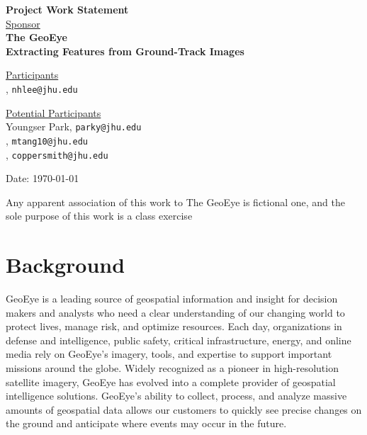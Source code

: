 \documentclass[12pt,letterpaper]{article}
\theoremstyle{definition}
\begin{document}
\def\shiftdowna{0.32in}  %
\def\shiftdownb{0.22in}  %


\begin{center}
\textbf{{\large Project Work Statement}}\\


\vspace \shiftdowna
\underline {Sponsor}\\ 
\vspace{5pt}
\textbf{{\large The GeoEye}}\\


\vspace \shiftdowna
\textbf{{\large Extracting Features from Ground-Track Images}}


\vspace{0.35in}
\vspace \shiftdownb
\underline {Participants} \\
\vspace{5pt}
, \texttt{nhlee@jhu.edu}

\vspace \shiftdownb
\underline {Potential Participants}\\
\vspace{5pt}
Youngser Park, \texttt{parky@jhu.edu} \\
\vspace{3pt}
, \texttt{mtang10@jhu.edu} \\
\vspace{3pt}
, \texttt{coppersmith@jhu.edu}

\vspace \shiftdowna
Date: \today

\end{center}

\vfill  
\footnoterule
\noindent \small{Any apparent association of this work to The GeoEye is
fictional one, and the sole purpose of this work is a class exercise}

\newpage

\section{Background} 
GeoEye is a leading source of geospatial information and insight for decision
makers and analysts who need a clear understanding of our changing world to
protect lives, manage risk, and optimize resources. Each day, organizations in
defense and intelligence, public safety, critical infrastructure, energy, and
online media rely on GeoEye's imagery, tools, and expertise to support
important missions around the globe. Widely recognized as a pioneer in
high-resolution satellite imagery, GeoEye has evolved into a complete provider
of geospatial intelligence solutions. GeoEye's ability to collect, process,
and analyze massive amounts of geospatial data allows our customers to quickly
see precise changes on the ground and anticipate where events may occur in the
future.
\end{document}
